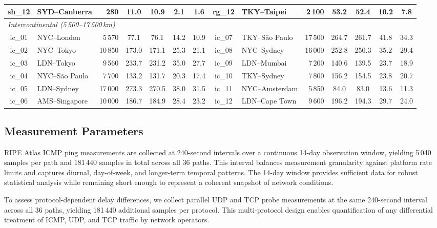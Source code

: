 \documentclass[conference]{IEEEtran}
\begin{document}
\begin{table}[t]
\begin{center}
\begin{tabular}{clrcccc|clrcccc}
sh\_12 & SYD--Canberra & 280 & 11.0 & 10.9 & 2.1 & 1.6 &
rg\_12 & TKY--Taipei & 2\,100 & 53.2 & 52.4 & 10.2 & 7.8 \\
\midrule
\multicolumn{14}{l}{\textit{Intercontinental (5\,500--17\,500\,km)}} \\
\cmidrule(lr){1-14}
ic\_01 & NYC--London & 5\,570 & 77.1 & 76.1 & 14.2 & 10.9 &
ic\_07 & TKY--S\~{a}o Paulo & 17\,500 & 264.7 & 261.7 & 41.8 & 34.3 \\
ic\_02 & NYC--Tokyo & 10\,850 & 173.0 & 171.1 & 25.3 & 21.1 &
ic\_08 & NYC--Sydney & 16\,000 & 252.8 & 250.3 & 35.2 & 29.4 \\
ic\_03 & LDN--Tokyo & 9\,560 & 233.7 & 231.2 & 35.0 & 27.7 &
ic\_09 & LDN--Mumbai & 7\,200 & 140.6 & 139.5 & 23.7 & 18.9 \\
ic\_04 & NYC--S\~{a}o Paulo & 7\,700 & 133.2 & 131.7 & 20.3 & 17.4 &
ic\_10 & TKY--Sydney & 7\,800 & 156.2 & 154.5 & 23.8 & 20.7 \\
ic\_05 & LDN--Sydney & 17\,000 & 273.3 & 270.5 & 38.0 & 31.5 &
ic\_11 & NYC--Amsterdam & 5\,850 & 84.0 & 83.0 & 13.6 & 11.3 \\
ic\_06 & AMS--Singapore & 10\,000 & 186.7 & 184.9 & 28.4 & 23.2 &
ic\_12 & LDN--Cape Town & 9\,600 & 196.2 & 194.3 & 29.7 & 24.0 \\
\bottomrule
\end{tabular}
\end{center}
\end{table}

\subsection{Measurement Parameters}

RIPE Atlas ICMP ping measurements are collected at 240-second intervals over a continuous 14-day observation window, yielding 5\,040 samples per path and 181\,440 samples in total across all 36 paths. This interval balances measurement granularity against platform rate limits and captures diurnal, day-of-week, and longer-term temporal patterns. The 14-day window provides sufficient data for robust statistical analysis while remaining short enough to represent a coherent snapshot of network conditions.

To assess protocol-dependent delay differences, we collect parallel UDP and TCP probe measurements at the same 240-second interval across all 36 paths, yielding 181\,440 additional samples per protocol. This multi-protocol design enables quantification of any differential treatment of ICMP, UDP, and TCP traffic by network operators.
\end{document}
